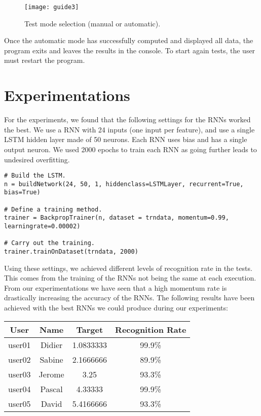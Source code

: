 \documentclass[a4paper]{article}
\begin{document}
{\begin{figure}[h!]
  \centering
    \texttt{[image: guide3]}
  \caption{Test mode selection (manual or automatic).}
  \label{guide3}
\end{figure}

Once the automatic mode has successfully computed and displayed all data, the program exits and leaves the results in the console. To start again tests, the user must restart the program.
\pagebreak

\section{Experimentations}
\label{experimentation}

For the experiments, we found that the following settings for the RNNs worked the best. We use a RNN with 24 inputs (one input per feature), and use a single LSTM hidden layer made of 50 neurons. Each RNN uses bias and has a single output neuron. We used 2000 epochs to train each RNN as going further leads to undesired overfitting.

\vspace{2mm}
\begin{lstlisting}
# Build the LSTM.
n = buildNetwork(24, 50, 1, hiddenclass=LSTMLayer, recurrent=True, bias=True)

# Define a training method.
trainer = BackpropTrainer(n, dataset = trndata, momentum=0.99, learningrate=0.00002)

# Carry out the training.
trainer.trainOnDataset(trndata, 2000)
\end{lstlisting}
\vspace{2mm}

Using these settings, we achieved different levels of recognition rate in the tests. This comes from the training of the RNNs not being the same at each execution. From our experimentations we have seen that a high momentum rate is drastically increasing the accuracy of the RNNs. The following results have been achieved with the best RNNs we could produce during our experiments:

\vspace{2mm}
\begin{center}
\begin{tabular}{|c|c||c|c|}
\hline 
User & Name & Target & Recognition Rate \\ 
\hline 
user01 & Didier & 1.0833333 & 99.9\% \\ 
\hline 
user02 & Sabine & 2.1666666 & 89.9\% \\ 
\hline 
user03 & Jerome & 3.25 & 93.3\% \\ 
\hline 
user04 & Pascal & 4.33333 & 99.9\% \\ 
\hline 
user05 & David & 5.4166666 & 93.3\% \\ 
\hline 
\end{tabular} 
\end{center}
\vspace{2mm}

}
\end{document}
